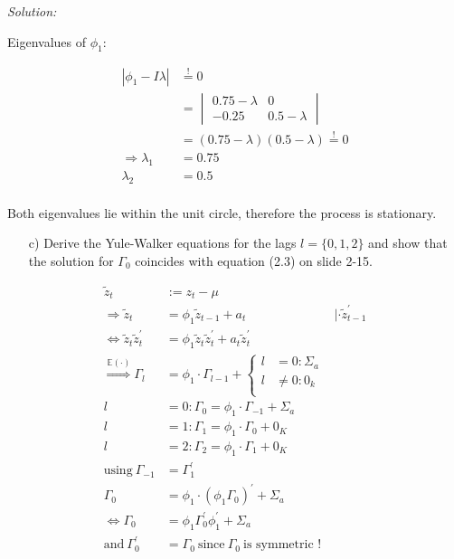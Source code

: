 \documentclass[12pt,a4paper]{article}
\begin{document}
\emph{Solution:}

Eigenvalues of \(\phi_1:\)

\begin{align*}
  \left| \phi_1 - I \lambda \right| & \overset{!}{=} 0 \\
  & = \begin{vmatrix}
  0.75 - \lambda & 0 \\
  -0.25 & 0.5 - \lambda 
  \end{vmatrix}\\
  & = (0.75 - \lambda)(0.5 - \lambda) \overset{!}{=}  0 \\
  \Rightarrow \lambda_1 & = 0.75 \\
  \lambda_2 & = 0.5\\
\end{align*}

Both eigenvalues lie within the unit circle, therefore the process is
stationary.

\begin{itemize}
    \item[c)] Derive the Yule-Walker equations for the lags $l = \{0,1,2 \}$ and show that the solution for $\Gamma_0$ coincides with equation (2.3) on slide 2-15.
\end{itemize}

\begin{align*}
  \tilde{z}_t & := z_t - \mu \\
  \Rightarrow \tilde{z}_t & =  \phi_1 \tilde{z}_{t-1} + a_t \qquad & | \cdot \tilde{z}_{t-1}^{'}   \\
  \Leftrightarrow \tilde{z}_t \tilde{z}_t^{'} & = \phi_1 \tilde{z}_t \tilde{z}_t^{'} + a_t \tilde{z}_t^{'}\\
  \overset{\mathbb{E} (\cdot)}{\Rightarrow} \Gamma_l & = \phi_1 \cdot \Gamma_{l- 1} + \begin{cases} 
  l & = 0: \Sigma_a \\
  l & \neq 0: 0_k\\
  \end{cases}\\
  l & = 0: \Gamma_0 = \phi_1 \cdot \Gamma_{-1} + \Sigma_a\\
  l & = 1: \Gamma_1 = \phi_1 \cdot \Gamma_{0} + 0_K \\
  l & = 2: \Gamma_2 = \phi_1 \cdot \Gamma_{1} + 0_K \\
  \text{using} \ \Gamma_{-1} & = \Gamma_{1}^{'}\\ 
  \Gamma_0 & = \phi_1 \cdot \left( \phi_1 \Gamma_0 \right)^{'} + \Sigma_a\\
  \Leftrightarrow \Gamma_0 & = \phi_1 \Gamma_0^{'} \phi_1^{'}  + \Sigma_a\\
   \text{and} \ \Gamma_0^{'} & = \Gamma_0 \ \text{since}  \ \Gamma_0 \ \text{is symmetric !}
\end{align*}
\end{document}

